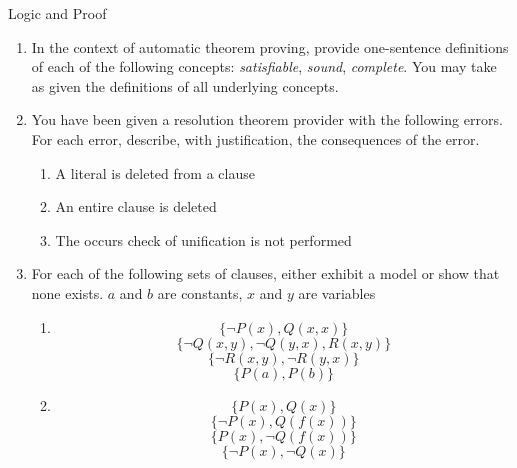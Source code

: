 \documentclass{tripos}  %
\begin{document}
\begin{question}[MockIB,year=2024,paper=1,question=13,author=rrw]{Logic and Proof}


  \begin{enumerate}
  \item In the context of automatic theorem proving, provide one-sentence definitions of each of the following concepts: {\em satisfiable}, {\em sound}, {\em complete}. You may take as given the definitions of all underlying concepts. 
  \item You have been given a resolution theorem provider with the following errors. For each error, describe, with justification, the consequences of the error.
    \begin{enumerate}
    \item A literal is deleted from a clause 
    \item An entire clause is deleted 
    \item The occurs check of unification is not performed 
    \end{enumerate}
  \item For each of the following sets of clauses, either exhibit a model or show that none exists. $a$ and $b$ are constants, $x$ and $y$ are variables
    \begin{enumerate}
    \item
      \[
      \{ \neg P(x), Q(x,x) \}
      \]
      \[
      \{ \neg Q(x,y), \neg Q(y,x), R(x,y) \}
      \]
      \[
      \{ \neg R(x,y), \neg R(y,x) \}
      \]
      \[
      \{ P(a), P(b) \}
      \] 
    \item
      \[
      \{ P(x), Q(x) \}
      \]
      \[
      \{ \neg P(x), Q(f(x)) \}
      \]
      \[
      \{ P(x), \neg Q(f(x)) \}
      \]
      \[
      \{ \neg P(x), \neg Q(x) \}
      \] 
    \end{enumerate}
   
    \end{enumerate}

  
\end{question}
\end{document}
